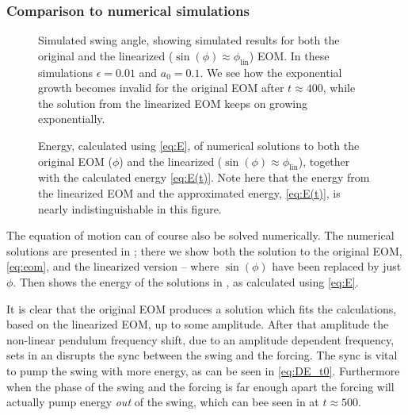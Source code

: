\documentclass[11pt,letter, swedish, english,%
]{article}
\begin{document}
\subsubsection{Comparison to numerical simulations}


\begin{figure}\centering
\caption{Simulated swing angle, showing simulated results for both the
  original and the linearized ($\sin(\phi)\approx\phi_\text{lin}$)
  EOM. In these simulations $\epsilon=0.01$ and $a_0=0.1$. We see how the
  exponential growth becomes invalid for the original EOM after
  $t\approx400$, while the solution from the linearized EOM keeps on
  growing exponentially. 
}
\label{fig:sim}
\end{figure}

\begin{figure}\centering
\caption{Energy, calculated using \eqref{eq:E}, of numerical solutions
  to both the original EOM ($\phi$) and the linearized
  ($\sin(\phi)\approx\phi_\text{lin}$), together with the calculated energy
  \eqref{eq:E(t)}. Note here that the energy from the linearized EOM
  and the approximated energy, \eqref{eq:E(t)}, is nearly
  indistinguishable in this figure.
}
\label{fig:sim_E}
\end{figure}

The equation of motion can of course also be solved numerically. The
numerical solutions are presented in ; there we show
both the solution to the original EOM, \eqref{eq:eom}, and the
linearized version -- where $\sin(\phi)$ have been replaced by just
$\phi$. Then 
 shows the energy of the solutions in
, as calculated using \eqref{eq:E}.

It is clear that the original EOM produces a solution which fits the
calculations, based on the linearized EOM, up to some amplitude. After
that amplitude the non-linear pendulum frequency shift, due to an
amplitude dependent frequency, sets in an disrupts the sync between
the swing and the forcing. The sync is vital to pump the swing with
more energy, as can be seen in \eqref{eq:DE_t0}. Furthermore when the
phase of the swing and the forcing is far enough apart the forcing
will actually pump energy \emph{out} of the swing, which can bee seen
in  at $t\approx500$.
\end{document}
